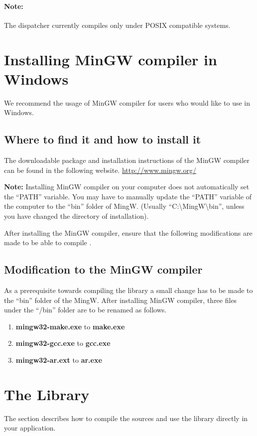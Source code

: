 \paragraph{Note:}
The dispatcher currently compiles only under POSIX compatible systems. 

\section*{Installing MinGW compiler in Windows}
We recommend the usage of MinGW compiler for users who would like to use \libalf in Windows. 

\subsection*{Where to find it and how to install it}
The downloadable package and installation instructions of the MinGW compiler can be found in the following website.
\url{http://www.mingw.org/} \vskip 1pt

\textbf{Note:} Installing MinGW compiler on your computer does not automatically set the ``PATH'' variable. You may have to manually update the ``PATH'' variable of the computer to the ``bin'' folder of MingW. (Usually ``C:\textbackslash MingW\textbackslash bin'', unless you have changed the directory of installation). 

After installing the MinGW compiler, ensure that the following modifications are made to be able to compile \libalf.

\subsection*{Modification to the MinGW compiler}

As a prerequisite towards compiling the library a small change has to be made to the ``bin'' folder of the MingW.   
After installing MinGW compiler, three files under the ``/bin'' folder are to be renamed as follows.
\begin{enumerate}
 \item \textbf{mingw32-make.exe} to \textbf{make.exe}
 \item \textbf{mingw32-gcc.exe} to \textbf{gcc.exe}
 \item \textbf{mingw32-ar.ext} to \textbf{ar.exe}	
\end{enumerate}
 
\section{The \libalf \cpp Library}
The section describes how to compile the sources and use the \cpp library directly in your application.

